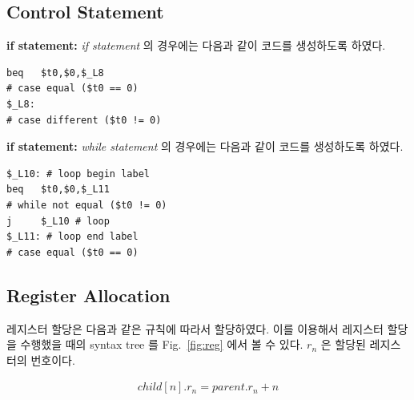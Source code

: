 \documentclass[a4paper,12p]{paper}
\begin{document}
\subsection{Control Statement}

\vspace{0.1in}
\noindent\textbf{if statement:} \textit{if statement} 의 경우에는 다음과 같이 코드를 생성하도록 하였다.

\begin{verbatim}
beq   $t0,$0,$_L8
# case equal ($t0 == 0)
$_L8:
# case different ($t0 != 0)
\end{verbatim}

\vspace{0.1in}
\noindent\textbf{if statement:} \textit{while statement} 의 경우에는 다음과 같이 코드를 생성하도록 하였다.

\begin{verbatim}
$_L10: # loop begin label
beq   $t0,$0,$_L11
# while not equal ($t0 != 0)
j     $_L10 # loop
$_L11: # loop end label
# case equal ($t0 == 0)
\end{verbatim}

\subsection{Register Allocation}
레지스터 할당은 다음과 같은 규칙에 따라서 할당하였다. 이를 이용해서 레지스터 할당을 수행했을 때의 syntax tree 를 Fig.~\ref{fig:reg} 에서 볼 수 있다. $r_n$ 은 할당된 레지스터의 번호이다.

\begin{align}
  child[n].r_n = parent.r_n + n
\end{align}
\end{document}
